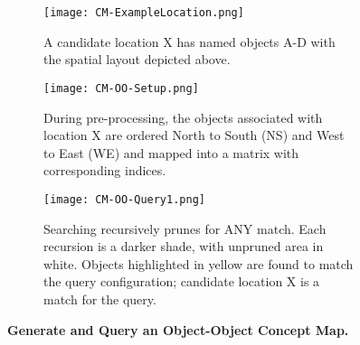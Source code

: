 \begin{figure*}[h]
    \centering
    \begin{subfigure}[t]{.3\textwidth}
        \texttt{[image: CM-ExampleLocation.png]}
        \caption{\small A candidate location X has named objects A-D with the spatial layout depicted above.}
        \label{fig:CM-Example}
    \end{subfigure}
    \hfill
    \begin{subfigure}[t]{.3\textwidth}
        \texttt{[image: CM-OO-Setup.png]}
        \caption{\small During pre-processing, the objects associated with location X are ordered North to South (NS) and West to East (WE) and mapped into a matrix with corresponding indices.}
        \label{fig:CM-OO-Setup}
    \end{subfigure}
    \hfill
        \begin{subfigure}[t]{.3\textwidth}
        \texttt{[image: CM-OO-Query1.png]}
        \caption{\small Searching recursively prunes for ANY match. Each recursion is a darker shade, with unpruned area in white. Objects highlighted in yellow are found to match the query configuration; candidate location X is a match for the query.}
        \label{fig:CM-OO-Query}
    \hfill
    \end{subfigure}
    \caption{\textbf{Generate and Query an Object-Object Concept Map.}}\label{figure:ConceptMap} 
\end{figure*}

